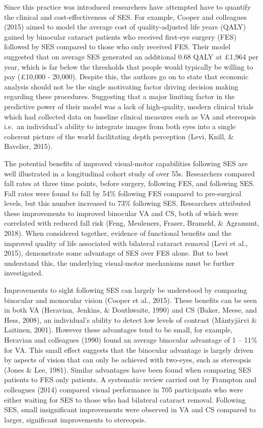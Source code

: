 \documentclass[
  english,
  man,floatsintext]{apa6}
\begin{document}
Since this practice was introduced researchers have attempted have to quantify the clinical and cost-effectiveness of SES.
For example, Cooper and colleagues (2015) aimed to model the average cost of quality-adjusted life years (QALY) gained by binocular cataract patients who received first-eye surgery (FES) followed by SES compared to those who only received FES.
Their model suggested that on average SES generated an additional 0.68 QALY at £1,964 per year, which is far below the thresholds that people would typically be willing to pay (£10,000 - 20,000).
Despite this, the authors go on to state that economic analysis should not be the single motivating factor driving decision making regarding these procedures.
Suggesting that a major limiting factor in the predictive power of their model was a lack of high-quality, modern clinical trials which had collected data on baseline clinical measures such as VA and stereopsis i.e.~an individual's ability to integrate images from both eyes into a single coherent picture of the world facilitating depth perception (Levi, Knill, \& Bavelier, 2015).

The potential benefits of improved visual-motor capabilities following SES are well illustrated in a longitudinal cohort study of over 55s.
Researchers compared fall rates at three time points, before surgery, following FES, and following SES.
Fall rates were found to fall by 54\% following FES compared to pre-surgical levels, but this number increased to 73\% following SES.
Researchers attributed these improvements to improved binocular VA and CS, both of which were correlated with reduced fall risk (Feng, Meuleners, Fraser, Brameld, \& Agramunt, 2018).
When considered together, evidence of functional benefits and the improved quality of life associated with bilateral cataract removal (Levi et al., 2015), demonstrate some advantage of SES over FES alone.
But to best understand this, the underlying visual-motor mechanisms must be further investigated.

Improvements to sight following SES can largely be understood by comparing binocular and monocular vision (Cooper et al., 2015).
These benefits can be seen in both VA (Heravian, Jenkins, \& Douthwaite, 1990) and CS (Baker, Meese, and Hess, 2008), an individual's ability to detect low levels of contrast (Mäntyjärvi \& Laitinen, 2001).
However these advantages tend to be small, for example, Heravian and colleagues (1990) found an average binocular advantage of 1 -- 11\% for VA.
This small effect suggests that the binocular advantage is largely driven by aspects of vision that can only be achieved with two-eyes, such as stereopsis (Jones \& Lee, 1981).
Similar advantages have been found when comparing SES patients to FES only patients.
A systematic review carried out by Frampton and colleagues (2014) compared visual performance in 705 participants who were either waiting for SES to those who had bilateral cataract removal.
Following SES, small insignificant improvements were observed in VA and CS compared to larger, significant improvements to stereopsis.
\end{document}
